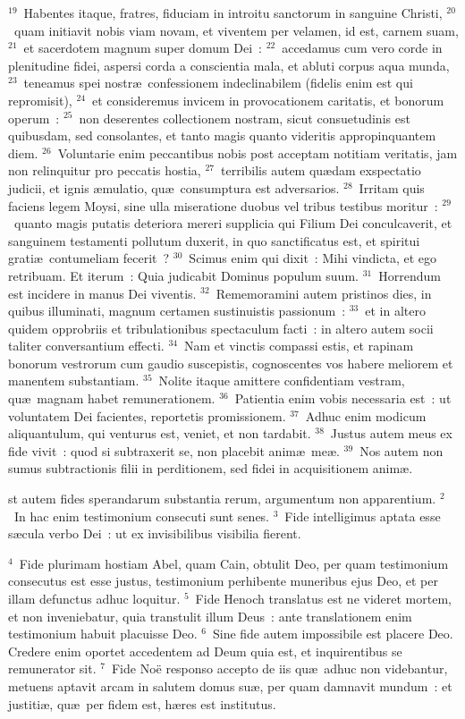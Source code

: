 ${}^{19}$~Habentes itaque, fratres, fiduciam in introitu sanctorum in sanguine Christi,
${}^{20}$~quam initiavit nobis viam novam, et viventem per velamen, id est, carnem suam,
${}^{21}$~et sacerdotem magnum super domum Dei~:
${}^{22}$~accedamus cum vero corde in plenitudine fidei, aspersi corda a conscientia mala, et abluti corpus aqua munda,
${}^{23}$~teneamus spei nostr\ae\ confessionem indeclinabilem (fidelis enim est qui repromisit),
${}^{24}$~et consideremus invicem in provocationem caritatis, et bonorum operum~:
${}^{25}$~non deserentes collectionem nostram, sicut consuetudinis est quibusdam, sed consolantes, et tanto magis quanto videritis appropinquantem diem.
${}^{26}$~Voluntarie enim peccantibus nobis post acceptam notitiam veritatis, jam non relinquitur pro peccatis hostia,
${}^{27}$~terribilis autem qu\ae dam exspectatio judicii, et ignis \ae mulatio, qu\ae\ consumptura est adversarios.
${}^{28}$~Irritam quis faciens legem Moysi, sine ulla miseratione duobus vel tribus testibus moritur~:
${}^{29}$~quanto magis putatis deteriora mereri supplicia qui Filium Dei conculcaverit, et sanguinem testamenti pollutum duxerit, in quo sanctificatus est, et spiritui grati\ae\ contumeliam fecerit~?
${}^{30}$~Scimus enim qui dixit~: Mihi vindicta, et ego retribuam. Et iterum~: Quia judicabit Dominus populum suum.
${}^{31}$~Horrendum est incidere in manus Dei viventis.
${}^{32}$~Rememoramini autem pristinos dies, in quibus illuminati, magnum certamen sustinuistis passionum~:
${}^{33}$~et in altero quidem opprobriis et tribulationibus spectaculum facti~: in altero autem socii taliter conversantium effecti.
${}^{34}$~Nam et vinctis compassi estis, et rapinam bonorum vestrorum cum gaudio suscepistis, cognoscentes vos habere meliorem et manentem substantiam.
${}^{35}$~Nolite itaque amittere confidentiam vestram, qu\ae\ magnam habet remunerationem.
${}^{36}$~Patientia enim vobis necessaria est~: ut voluntatem Dei facientes, reportetis promissionem.
${}^{37}$~Adhuc enim modicum aliquantulum, qui venturus est, veniet, et non tardabit.
${}^{38}$~Justus autem meus ex fide vivit~: quod si subtraxerit se, non placebit anim\ae\ me\ae .
${}^{39}$~Nos autem non sumus subtractionis filii in perditionem, sed fidei in acquisitionem anim\ae .

\bchapter
{}st autem fides sperandarum substantia rerum, argumentum non apparentium.
${}^{2}$~In hac enim testimonium consecuti sunt senes.
${}^{3}$~Fide intelligimus aptata esse s\ae cula verbo Dei~: ut ex invisibilibus visibilia fierent.


${}^{4}$~Fide plurimam hostiam Abel, quam Cain, obtulit Deo, per quam testimonium consecutus est esse justus, testimonium perhibente muneribus ejus Deo, et per illam defunctus adhuc loquitur.
${}^{5}$~Fide Henoch translatus est ne videret mortem, et non inveniebatur, quia transtulit illum Deus~: ante translationem enim testimonium habuit placuisse Deo.
${}^{6}$~Sine fide autem impossibile est placere Deo. Credere enim oportet accedentem ad Deum quia est, et inquirentibus se remunerator sit.
${}^{7}$~Fide No\"e responso accepto de iis qu\ae\ adhuc non videbantur, metuens aptavit arcam in salutem domus su\ae , per quam damnavit mundum~: et justiti\ae , qu\ae\ per fidem est, h\ae res est institutus.


